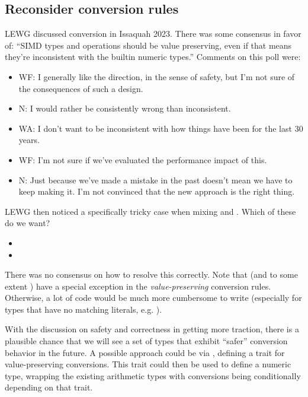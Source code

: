 \subsection{Reconsider conversion rules}\label{sec:reconsider_conversions}

LEWG discussed conversion in Issaquah 2023.
There was some consensus in favor of: ``SIMD types and operations should be
value preserving, even if that means they're inconsistent with the builtin
numeric types.''
Comments on this poll were:
\begin{itemize}
  \item WF: I generally like the direction, in the sense of safety, but I'm
    not sure of the consequences of such a design.

  \item N: I would rather be consistently wrong than inconsistent.

  \item WA: I don't want to be inconsistent with how things have been for the last 30 years.

  \item WF: I'm not sure if we've evaluated the performance impact of this.

  \item N: Just because we've made a mistake in the past doesn't mean we have to keep making it. I'm not convinced that the new approach is the right thing.
\end{itemize}

LEWG then noticed a specifically tricky case when mixing  and .
Which of these do we want?
\begin{itemize}
  \item {}
  \item {}
\end{itemize}

There was no consensus on how to resolve this correctly.
Note that  (and to some extent ) have a special
exception in the \emph{value-preserving} conversion rules.
Otherwise, a lot of code would be much more cumbersome to write (especially for
types that have no matching literals, e.g. ).

With the discussion on safety and correctness in \CC{} getting more traction,
there is a plausible chance that we will see a set of types that exhibit
``safer'' conversion behavior in the future.
A possible approach could be via \cite{P2509R0}, defining a trait for
value-preserving conversions.
This trait could then be used to define a numeric type, wrapping the existing
arithmetic types with conversions being conditionally  depending
on that trait.

